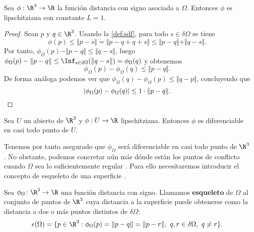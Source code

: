 \begin{lema}
    Sea $\phi:\R^3\to \R$ la función distancia con signo asociada a $\Omega$. Entonces $\phi$ es lipschitziana con constante $L=1$.
\end{lema}
\begin{proof}
    Sean $p$ y $q\in \R^3$. Usando la \autoref{def:sdf}, para todo $s\in \delta\Omega$ se tiene
    \begin{equation*}
        \phi(p) \le \Vert p-s\Vert = \Vert p-q+q+s\Vert \le \Vert p-q\Vert + \Vert q-s\Vert.
    \end{equation*}
    Por tanto, $\phi_{\Omega}(p) - \Vert p-q\Vert \le \Vert q-s \Vert$, luego $\phi_{\Omega}(p) - \Vert p-q\Vert \le \Inf_{s\in \delta\Omega}(\Vert q-s \Vert) = \phi_{\Omega}(q)$ y obtenemos
    \begin{equation*}
         \phi_{\Omega}(p) - \phi_{\Omega}(q) \le \Vert p-q \Vert.
    \end{equation*}
    De forma análoga podemos ver que $\phi_{\Omega}(q) - \phi_{\Omega}(p) \le \Vert q-p \Vert$, concluyendo que
    \begin{equation*}
        \vert \phi_{\Omega}(p) - \phi_{\Omega}(q)\vert \le 1\cdot \Vert p-q\Vert.\qedhere
    \end{equation*}
\end{proof}

\begin{lema}
    Sea $U$ un abierto de $\R^3$ y $\phi:U\to \R$ lipschitziana. Entonces $\phi$ es diferenciable en casi todo punto de $U$.
\end{lema}

Tenemos por tanto asegurado que $\phi_{\Omega}$ será diferenciable en casi todo punto de $\R^3$. No obstante, podemos concretar aún más dónde están los puntos de conflicto cuando $\Omega$ sea lo suficientemente regular \cite{dif1,dif2}. Para ello necesitaremos introducir el concepto de esqueleto de una superficie \cite{derivWiki}.
\begin{definicion}
    Sea $\phi_{\Omega} \colon \R^3\to \R$ una función distancia con signo. Llamamos \textbf{esqueleto} de $\Omega$ al conjunto de puntos de $\R^3$ cuya distancia a la superficie puede obtenerse como la distancia a dos o más puntos distintos de $\delta \Omega$:
    \begin{equation}
        \epsilon(\Omega) = \{p\in \R^3 : \phi_{\Omega}(p) = \Vert p-q\Vert = \Vert p-r\Vert,\ q,r\in \delta\Omega ,\ q\neq r \}.
    \end{equation}
\end{definicion}


